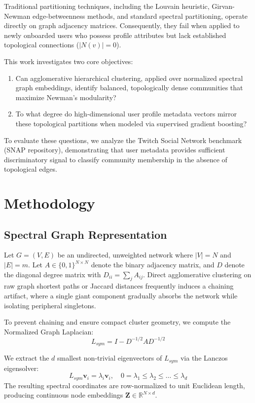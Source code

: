 \documentclass[sn-mathphys,Numbered]{sn-jnl}
\begin{document}
Traditional partitioning techniques, including the Louvain heuristic, Girvan-Newman edge-betweenness methods, and standard spectral partitioning, operate directly on graph adjacency matrices. Consequently, they fail when applied to newly onboarded users who possess profile attributes but lack established topological connections ($|N(v)| = 0$).

This work investigates two core objectives:
\begin{enumerate}
    \item Can agglomerative hierarchical clustering, applied over normalized spectral graph embeddings, identify balanced, topologically dense communities that maximize Newman's modularity?
    \item To what degree do high-dimensional user profile metadata vectors mirror these topological partitions when modeled via supervised gradient boosting?
\end{enumerate}

To evaluate these questions, we analyze the Twitch Social Network benchmark (SNAP repository), demonstrating that user metadata provides sufficient discriminatory signal to classify community membership in the absence of topological edges.

\section{Methodology}\label{sec2}

\subsection{Spectral Graph Representation}
Let $G = (V, E)$ be an undirected, unweighted network where $|V| = N$ and $|E| = m$. Let $A \in \{0, 1\}^{N \times N}$ denote the binary adjacency matrix, and $D$ denote the diagonal degree matrix with $D_{ii} = \sum_j A_{ij}$. Direct agglomerative clustering on raw graph shortest paths or Jaccard distances frequently induces a chaining artifact, where a single giant component gradually absorbs the network while isolating peripheral singletons.

To prevent chaining and ensure compact cluster geometry, we compute the Normalized Graph Laplacian:
\begin{equation}
L_{sym} = I - D^{-1/2} A D^{-1/2}
\label{eq:laplacian}
\end{equation}

We extract the $d$ smallest non-trivial eigenvectors of $L_{sym}$ via the Lanczos eigensolver:
\begin{equation}
L_{sym} \mathbf{v}_i = \lambda_i \mathbf{v}_i, \quad 0 = \lambda_1 \le \lambda_2 \le \dots \le \lambda_d
\end{equation}
The resulting spectral coordinates are row-normalized to unit Euclidean length, producing continuous node embeddings $\mathbf{Z} \in \mathbb{R}^{N \times d}$.
\end{document}
